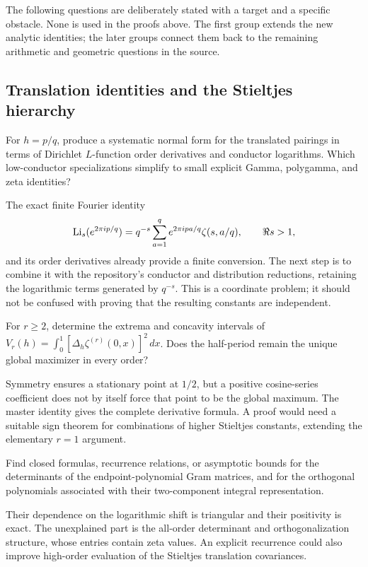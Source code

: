 The following questions are deliberately stated with a target and a
specific obstacle. None is used in the proofs above. The first group
extends the new analytic identities; the later groups connect them back
to the remaining arithmetic and geometric questions in the source.

\subsection{Translation identities and the Stieltjes hierarchy}

\begin{question}
For $h=p/q$, produce a systematic normal form for the translated
pairings in terms of Dirichlet $L$-function order derivatives and
conductor logarithms. Which low-conductor specializations simplify
to small explicit Gamma, polygamma, and zeta identities?
\end{question}
The exact finite Fourier identity
\[
 \operatorname{Li}_s(e^{2\pi ip/q})=q^{-s}\sum_{a=1}^q
 e^{2\pi ipa/q}\zeta(s,a/q),\qquad \Re s>1,
\]
and its order derivatives already provide a finite conversion.
The next step is to combine it with the repository's conductor and
distribution reductions, retaining the logarithmic terms generated
by $q^{-s}$. This is a coordinate problem; it should not be confused
with proving that the resulting constants are independent.

\begin{question}
For $r\geq2$, determine the extrema and concavity intervals of
$V_r(h)=\int_0^1[\Delta_h\zeta^{(r)}(0,x)]^2\,dx$.
Does the half-period remain the unique global maximizer in every order?
\end{question}
Symmetry ensures a stationary point at $1/2$, but a positive cosine-series
coefficient does not by itself force that point to be the global maximum.
The master identity gives the complete derivative formula. A proof
would need a suitable sign theorem for combinations of higher
Stieltjes constants, extending the elementary $r=1$ argument.

\begin{question}
Find closed formulas, recurrence relations, or asymptotic bounds for
the determinants of the endpoint-polynomial Gram matrices, and for
the orthogonal polynomials associated with their two-component
integral representation.
\end{question}
Their dependence on the logarithmic shift is triangular and their
positivity is exact. The unexplained part is the all-order determinant
and orthogonalization structure, whose entries contain zeta values.
An explicit recurrence could also improve high-order evaluation of
the Stieltjes translation covariances.

